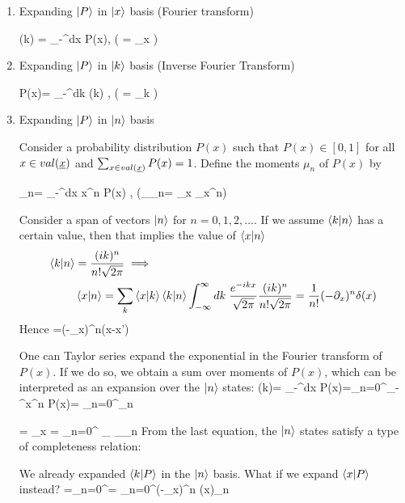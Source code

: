 \begin{enumerate}
\item Expanding $\left|P\right\rangle$ in $\left|x\right\rangle$ basis
(Fourier transform)

\beq
{}(k)
=
\int_{-\infty}^\infty dx\; 
P(x),\quad
\left(
=
\sum_x
\right)
\eeq

\item Expanding $\left|P\right\rangle$ in $\left|k\right\rangle$ basis
(Inverse Fourier Transform)

\beq
P(x)=
\int_{-\infty}^\infty dk\;
(k)
,\quad
\left(
=
\sum_k 
\right)
\eeq

\item Expanding $\left|P\right\rangle$ in $\left|n\right\rangle$ basis

Consider a probability distribution $P(x)$
such that $P(x)\in[0,1]$ for all $x\in val(\rvx)$ and $\sum_{x\in val(\rvx)} P(x)=1$.
Define the moments
$\mu_n$  of $P(x)$ by

\beq
\mu_n= \int_{-\infty}^\infty dx\; x^n P(x)
,\quad
\left(_{\mu_n}=
\sum_x _{x^n}\right)
\eeq

Consider a span of vectors $\left|n\right\rangle$ for
$n=0, 1, 2, \ldots$.
If we assume $\left\langle k|n\right\rangle$ has a certain value, then 
that implies the value of $\left\langle x|n\right\rangle$
\begin{align}
\left\langle k|n\right\rangle&=\frac{(ik)^n}{n!\sqrt{2\pi}}\implies
\\&
\left\langle x|n\right\rangle= \sum_k\left\langle x|k\right\rangle\left\langle k|n\right\rangle
\int_{-\infty}^\infty dk\; \frac{e^{-ikx}}{\sqrt{2\pi}}\frac{(ik)^n}{n!\sqrt{2\pi}}=\frac{1}{n!}
(-\partial_x)^n\delta(x)
\end{align}
Hence
\beq
{}
\eeq
\beq
{}=(-\partial_x)^n\delta(x-x')
\eeq

One can Taylor series expand the exponential in the Fourier
transform of $P(x)$. If we do so,
we obtain a sum over moments of $P(x)$,
which can be interpreted as an 
expansion over the $\left|n\right\rangle$ states:
\beq
{}(k)=
\int_{-\infty}^\infty dx\;  P(x)=\sum_{n=0}^\infty {}\int_{-\infty}^\infty x^n P(x)=
\sum_{n=0}^\infty {}\mu_n
\eeq




\beq
{}=
\sum_x =
\sum_{n=0}^\infty
{}_{}
_{\mu_n}
\eeq
From the last equation,
the $\left|n\right\rangle$ states satisfy
a type of completeness relation:

\beq
{}
\eeq
We already expanded $\left\langle k|P\right\rangle$ in the $\left|n\right\rangle$
basis. What if we expand $\left\langle x|P\right\rangle$ instead?
\beq
{}=\sum_{n=0}^\infty {}=
\sum_{n=0}^\infty {}(-\partial_x)^n \delta(x)\mu_n
\eeq


\end{enumerate}


